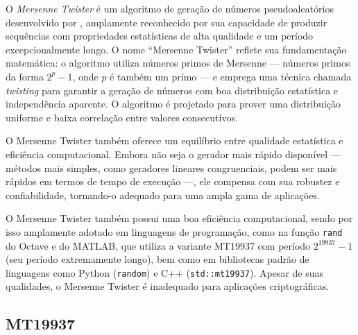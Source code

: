 O \emph{Mersenne Twister} é um algoritmo de geração de números pseudoaleatórios
desenvolvido por \textcite{matsumoto1998mersenne}, %
amplamente
reconhecido por sua capacidade de produzir sequências com propriedades
estatísticas de alta qualidade e um período excepcionalmente longo. O nome
``Mersenne Twister'' reflete sua fundamentação matemática: o algoritmo utiliza
números primos de Mersenne --- números primos da forma $2^p - 1$, onde $p$ é
também um primo --- e emprega uma técnica chamada \textit{twisting} para
garantir a geração de números com boa distribuição estatística e independência
aparente. O algoritmo é projetado para prover uma distribuição uniforme e baixa
correlação entre valores consecutivos.

O Mersenne Twister também oferece um equilíbrio entre qualidade estatística e
eficiência computacional. Embora não seja o gerador mais rápido disponível ---
métodos mais simples, como geradores lineares congruenciais, podem ser mais
rápidos em termos de tempo de execução ---, ele compensa com sua robustez e
confiabilidade, tornando-o adequado para uma ampla gama de aplicações. 

O Mersenne Twister também possui uma boa eficiência computacional, sendo por
isso amplamente adotado em linguagens de programação, como na função
\texttt{rand} do Octave e do MATLAB, que utiliza a variante MT19937 com período
$2^{19937} - 1$ (seu período extremamente longo), bem como em bibliotecas
padrão de linguagens como Python (\texttt{random}) e C++
(\texttt{std::mt19937}). Apesar de suas qualidades, o Mersenne Twister é
inadequado para aplicações criptográficas.


\subsection{MT19937}

